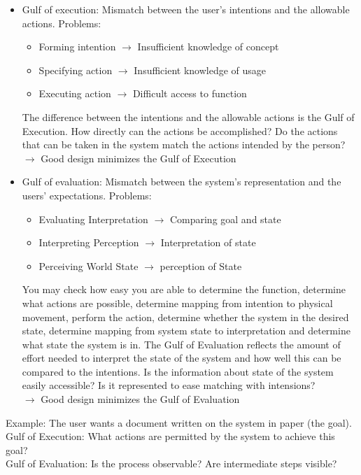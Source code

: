 \begin{itemize}
\item Gulf of execution: Mismatch between the user's intentions and the allowable actions. Problems:
\begin{itemize}
\item Forming intention $\rightarrow$ Insufficient knowledge of concept
\item Specifying action $\rightarrow$ Insufficient knowledge of usage
\item Executing action $\rightarrow$ Difficult access to function
\end{itemize}
The difference between the intentions and the allowable actions is the Gulf of Execution. How directly can the actions be accomplished? Do the actions that can be taken in the system match the actions intended by the person?\\
$\rightarrow$ Good design minimizes the Gulf of Execution
\item Gulf of evaluation: Mismatch between the system's representation and the users' expectations. Problems:
\begin{itemize}
\item Evaluating Interpretation $\rightarrow$  Comparing goal and state
\item Interpreting Perception $\rightarrow$ Interpretation of state
\item Perceiving World State $\rightarrow$ perception of State
\end{itemize}
You may check how easy you are able to determine the function, determine what actions are possible, determine mapping from intention to physical movement, perform the action, determine whether the system in the desired state, determine mapping from system state to interpretation and determine what state the system is in. The Gulf of Evaluation reflects the amount of effort needed to interpret the state of the system and how well this can be compared to the intentions. Is the information about state of the system easily accessible? Is it represented to ease matching with intensions?\\
$\rightarrow$ Good design minimizes the Gulf of Evaluation
\end{itemize}
Example: The user wants a document written on the system in paper (the goal).\\
Gulf of Execution: What actions are permitted by the system to achieve this goal?\\
Gulf of Evaluation: Is the process observable? Are intermediate steps visible?\\
